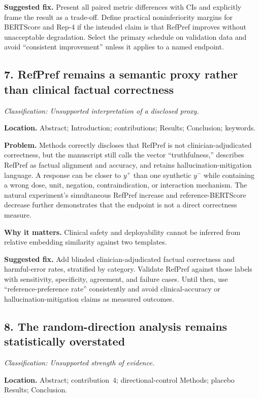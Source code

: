 \documentclass[11pt]{article}
\newcommand{\findinglabel}[1]{\textbf{#1}}
\newcommand{\classification}[1]{\textit{Classification: #1.}}
\begin{document}
\findinglabel{Suggested fix.} Present all paired metric differences with CIs and explicitly frame the result as a trade-off.  Define practical noninferiority margins for BERTScore and Rep-4 if the intended claim is that RefPref improves without unacceptable degradation.  Select the primary schedule on validation data and avoid ``consistent improvement'' unless it applies to a named endpoint.

\subsection*{7. RefPref remains a semantic proxy rather than clinical factual correctness}

\classification{Unsupported interpretation of a disclosed proxy}

\findinglabel{Location.} Abstract; Introduction; contributions; Results; Conclusion; keywords.

\findinglabel{Problem.} Methods correctly discloses that RefPref is not clinician-adjudicated correctness, but the manuscript still calls the vector ``truthfulness,'' describes RefPref as factual alignment and accuracy, and retains hallucination-mitigation language.  A response can be closer to $y^+$ than one synthetic $y^-$ while containing a wrong dose, unit, negation, contraindication, or interaction mechanism.  The natural experiment's simultaneous RefPref increase and reference-BERTScore decrease further demonstrates that the endpoint is not a direct correctness measure.

\findinglabel{Why it matters.} Clinical safety and deployability cannot be inferred from relative embedding similarity against two templates.

\findinglabel{Suggested fix.} Add blinded clinician-adjudicated factual correctness and harmful-error rates, stratified by category.  Validate RefPref against those labels with sensitivity, specificity, agreement, and failure cases.  Until then, use ``reference-preference rate'' consistently and avoid clinical-accuracy or hallucination-mitigation claims as measured outcomes.

\subsection*{8. The random-direction analysis remains statistically overstated}

\classification{Unsupported strength of evidence}

\findinglabel{Location.} Abstract; contribution~4; directional-control Methods; placebo Results; Conclusion.
\end{document}
